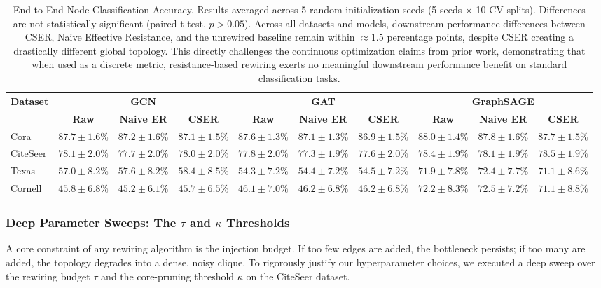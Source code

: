 \documentclass[10pt]{article} %
\begin{document}
\begin{table}[h]
\centering
\begin{tabular}{l|ccc|ccc|ccc}
\hline
\textbf{Dataset} & \multicolumn{3}{c|}{\textbf{GCN}} & \multicolumn{3}{c|}{\textbf{GAT}} & \multicolumn{3}{c}{\textbf{GraphSAGE}} \\
 & \textbf{Raw} & \textbf{Naive ER} & \textbf{CSER} & \textbf{Raw} & \textbf{Naive ER} & \textbf{CSER} & \textbf{Raw} & \textbf{Naive ER} & \textbf{CSER} \\
\hline
Cora & $87.7 \pm 1.6\%$ & $87.2 \pm 1.6\%$ & $87.1 \pm 1.5\%$ & $87.6 \pm 1.3\%$ & $87.1 \pm 1.3\%$ & $86.9 \pm 1.5\%$ & $88.0 \pm 1.4\%$ & $87.8 \pm 1.6\%$ & $87.7 \pm 1.5\%$ \\
CiteSeer & $78.1 \pm 2.0\%$ & $77.7 \pm 2.0\%$ & $78.0 \pm 2.0\%$ & $77.8 \pm 2.0\%$ & $77.3 \pm 1.9\%$ & $77.6 \pm 2.0\%$ & $78.4 \pm 1.9\%$ & $78.1 \pm 1.9\%$ & $78.5 \pm 1.9\%$ \\
Texas & $57.0 \pm 8.2\%$ & $57.6 \pm 8.2\%$ & $58.4 \pm 8.5\%$ & $54.3 \pm 7.2\%$ & $54.4 \pm 7.2\%$ & $54.5 \pm 7.2\%$ & $71.9 \pm 7.8\%$ & $72.4 \pm 7.7\%$ & $71.1 \pm 8.6\%$ \\
Cornell & $45.8 \pm 6.8\%$ & $45.2 \pm 6.1\%$ & $45.7 \pm 6.5\%$ & $46.1 \pm 7.0\%$ & $46.2 \pm 6.8\%$ & $46.2 \pm 6.8\%$ & $72.2 \pm 8.3\%$ & $72.5 \pm 7.2\%$ & $71.1 \pm 8.8\%$ \\
\hline
\end{tabular}
\caption{End-to-End Node Classification Accuracy. Results averaged across 5 random initialization seeds (5 seeds $\times$ 10 CV splits). Differences are not statistically significant (paired t-test, $p > 0.05$). Across all datasets and models, downstream performance differences between CSER, Naive Effective Resistance, and the unrewired baseline remain within $\approx 1.5$ percentage points, despite CSER creating a drastically different global topology. This directly challenges the continuous optimization claims from prior work, demonstrating that when used as a discrete metric, resistance-based rewiring exerts no meaningful downstream performance benefit on standard classification tasks.}
\label{tab:gnn_benchmarks}
\end{table}

\subsubsection{Deep Parameter Sweeps: The $\tau$ and $\kappa$ Thresholds}
A core constraint of any rewiring algorithm is the injection budget. If too few edges are added, the bottleneck persists; if too many are added, the topology degrades into a dense, noisy clique. To rigorously justify our hyperparameter choices, we executed a deep sweep over the rewiring budget $\tau$ and the core-pruning threshold $\kappa$ on the CiteSeer dataset.
\end{document}
